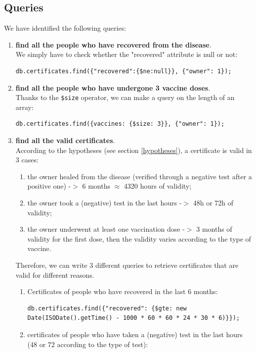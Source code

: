 \documentclass{article}
\begin{document}
\subsection{Queries}
We have identified the following queries:
\begin{enumerate}
\item \textbf{find all the people who have recovered from the disease}.\\
We simply have to check whether the "recovered" attribute is null or not:
\begin{lstlisting}
db.certificates.find({"recovered":{$ne:null}}, {"owner": 1});
    \end{lstlisting}
    \item \textbf{find all the people who have undergone 3 vaccine doses}.\\
    Thanks to the \verb|$size| operator, we can make a query on the length of an array:
    \begin{lstlisting}
db.certificates.find({vaccines: {$size: 3}}, {"owner": 1});
    \end{lstlisting}
    \item \textbf{find all the valid certificates}.\\
    According to the hypotheses (see section \ref{hypotheses}), a certificate is valid in 3 cases:
    \begin{enumerate}
            \item the owner healed from the disease (verified through a negative test after a positive one) -$>$ 6 months $\approx$ 4320 hours of validity;
        \item the owner took a (negative) test in the last hours -$>$ 48h or 72h of validity;
        \item the owner underwent at least one vaccination dose -$>$ 3 months of validity for the first dose, then the validity varies according to the type of vaccine.
    \end{enumerate}
    Therefore, we can write 3 different queries to retrieve certificates that are valid for different reasons.\\
    \begin{enumerate}
        \item Certificates of people who have recovered in the last 6 months:
    \begin{lstlisting}
db.certificates.find({"recovered": {$gte: new Date(ISODate().getTime() - 1000 * 60 * 60 * 24 * 30 * 6)}});
    \end{lstlisting}
    \item certificates of people who have taken a (negative) test in the last hours (48 or 72 according to the type of test):

\end{enumerate}
\end{enumerate}
\end{document}
